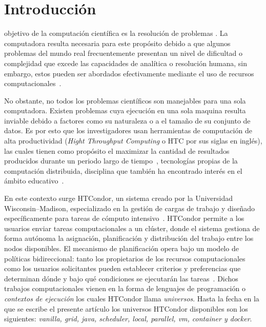 \section{Introducción}
 objetivo de la computación científica es la resolución
de problemas \cite{landau01}. La computadora resulta necesaria para este propósito debido a
que algunos problemas del mundo real frecuentemente presentan un nivel de dificultad
o complejidad que excede las capacidades de analítica o resolución humana, sin embargo,
estos pueden ser abordados efectivamente mediante el uso
de recursos computacionales~\cite{landau01}.


No obstante, no todos los problemas científicos son
manejables para una sola computadora. Existen problemas cuya ejecución en una sola maquina resulta
inviable debido a factores como su naturaleza o a el tamaño de su conjunto de datos. Es por esto
que los investigadores usan herramientas de computación de alta productividad
(\textit{Hight Throughput Computing} o HTC por sus siglas en inglés), las cuales tienen como
propósito el maximizar la cantidad de resultados producidos durante un periodo
largo de tiempo~\cite{juve-01},
tecnologías propias de la computación distribuida, disciplina que también
ha encontrado interés en el ámbito educativo~\cite{Senol-01}.

En este contexto surge HTCondor, un sistema creado por la
Universidad Wisconsin–Madison, especializado en la gestión de cargas
de trabajo y diseñado específicamente para tareas de cómputo intensivo~\cite{chang-01, htcondor-description}.
HTCondor permite a los usuarios enviar tareas computacionales a un clúster,
donde el sistema gestiona de forma autónoma la asignación, planificación y distribución del
trabajo entre los nodos disponibles. El mecanismo de planificación opera bajo un
modelo de políticas bidireccional: tanto los propietarios de los recursos computacionales
como los usuarios solicitantes pueden establecer criterios y preferencias
que determinan dónde y bajo qué condiciones se ejecutarán las tareas~\cite{htcondor-description}.
Dichos trabajos computacionales vienen en la forma de lenguajes de programación
o \textit{contextos de ejecución} los cuales HTCondor llama
\textit{universos}. Hasta la fecha en la que se escribe el presente artículo
los universos HTCondor disponibles son los siguientes: \textit{vanilla, grid, java, scheduler,
	local, parallel, vm, container y docker}.


